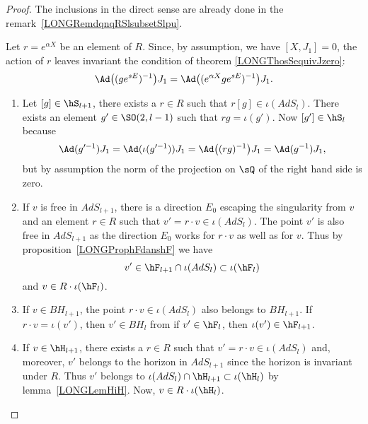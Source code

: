 \begin{proof}
	The inclusions in the direct sense are already done in the remark~\ref{LONGRemdqnqRSlsubsetSlpu}.

	Let $r= e^{\alpha X}$ be an element of $R$. Since, by assumption, we have $[X,J_1]=0$, the action of $r$ leaves invariant the condition of theorem \eqref{LONGThosSequivJzero}:
	\begin{equation}        \label{LONGEqalpharjnagitpas}
		\Ad\big( (g e^{sE})^{-1} \big)J_1=\Ad\big( ( e^{\alpha X}g e^{sE})^{-1} \big)J_1.
	\end{equation}
	\begin{enumerate}
		\item
		      Let $[g]\in\hS_{l+1}$, there exists a $r\in R$ such that $r[g]\in \iota(AdS_l)$. There exists an element $g'\in \SO(2,l-1)$ such that $rg=\iota(g')$. Now $[g']\in\hS_l$ because
		      \begin{equation}
			      \Ad(g'^{-1})J_1=\Ad(\iota(g'^{-1}))J_1=\Ad\big(  (rg)^{-1} \big)J_1=\Ad(g^{-1})J_1,
		      \end{equation}
		      but by assumption the norm of the projection on $\sQ$ of the right hand side is zero.

		\item
		      If $v$ is free in $AdS_{l+1}$, there is a direction $E_0$ escaping the singularity from $v$ and an element $r\in R$ such that $v'=r\cdot v\in\iota(AdS_l)$. The point $v'$ is also free in $AdS_{l+1}$ as the direction $E_0$ works for $r\cdot v$ as well as for $v$. Thus by proposition~\ref{LONGProphFdanshF} we have
		      \begin{equation}
			      v'\in\hF_{l+1}\cap\iota(AdS_l)\subset\iota(\hF_l)
		      \end{equation}
		      and $v\in R\cdot\iota(\hF_l)$.
		\item
		      If $v\in BH_{l+1}$, the point $r\cdot v\in\iota(AdS_l)$ also belongs to $BH_{l+1}$. If $r\cdot v=\iota(v')$, then $v'\in BH_l$ from if $v'\in\hF_l$, then $\iota(v')\in\hF_{l+1}$.
		\item
		      If $v\in\hH_{l+1}$, there exists a $r\in R$ such that $v'=r\cdot v\in\iota(AdS_l)$ and, moreover, $v'$ belongs to the horizon in $AdS_{l+1}$ since the horizon is invariant under $R$. Thus $v'$ belongs to $\iota(AdS_l)\cap\hH_{l+1}\subset \iota(\hH_l)$ by lemma~\ref{LONGLemHiH}.  Now, $v\in R\cdot\iota(\hH_l)$.

	\end{enumerate}
\end{proof}

